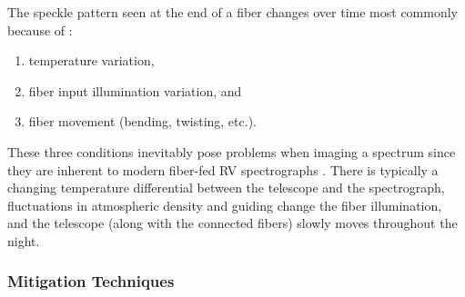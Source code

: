 \documentclass[11pt]{article}
\begin{document}
The speckle pattern seen at the end of a fiber changes over time most commonly because of \citep{Epworth1978}:
\begin{enumerate}
\item temperature variation,
\item fiber input illumination variation, and
\item fiber movement (bending, twisting, etc.).
\end{enumerate}
These three conditions inevitably pose problems when imaging a spectrum since they are inherent to modern fiber-fed RV spectrographs \cite{Baudrand2001, Mahadevan2014}. There is typically a changing temperature differential between the telescope and the spectrograph, fluctuations in atmospheric density and guiding change the fiber illumination, and the telescope (along with the connected fibers) slowly moves throughout the night.

\subsubsection{Mitigation Techniques}
\label{subsec:mitigation}
\end{document}
